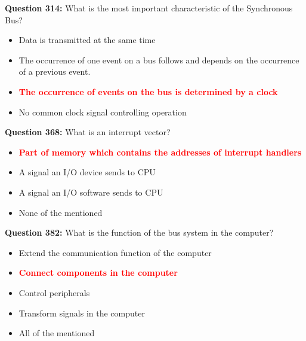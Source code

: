 \documentclass[12pt,a4paper]{article}
\begin{document}
\vspace{0.5cm}

\vspace{0.5cm}

\textbf{Question 314:} What is the most important characteristic of the Synchronous Bus?

\begin{itemize}
    \item[\textbf{A.}] Data is transmitted at the same time
    \item[\textbf{B.}] The occurrence of one event on a bus follows and depends on the occurrence of a previous event.
    \item[\textbf{C.}] \textcolor{red}{\textbf{The occurrence of events on the bus is determined by a clock}}
    \item[\textbf{D.}] No common clock signal controlling operation
\end{itemize}

\vspace{0.5cm}

\vspace{0.5cm}

\textbf{Question 368:} What is an interrupt vector?

\begin{itemize}
    \item[\textbf{A.}] \textcolor{red}{\textbf{Part of memory which contains the addresses of interrupt handlers}}
    \item[\textbf{B.}] A signal an I/O device sends to CPU
    \item[\textbf{C.}] A signal an I/O software sends to CPU
    \item[\textbf{D.}] None of the mentioned
\end{itemize}

\vspace{0.5cm}

\vspace{0.5cm}

\textbf{Question 382:} What is the function of the bus system in the computer?

\begin{itemize}
    \item[\textbf{A.}] Extend the communication function of the computer
    \item[\textbf{B.}] \textcolor{red}{\textbf{Connect components in the computer}}
    \item[\textbf{C.}] Control peripherals
    \item[\textbf{D.}] Transform signals in the computer
    \item[\textbf{E.}] All of the mentioned
\end{itemize}
\end{document}
